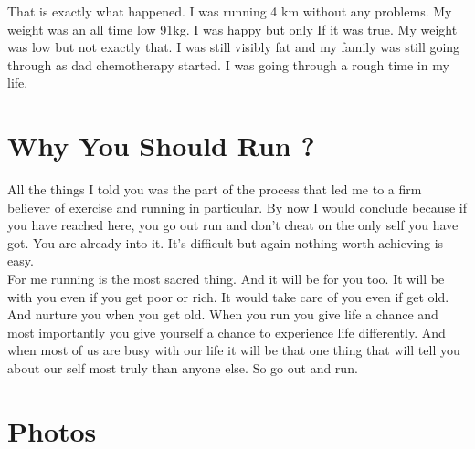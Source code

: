 \documentclass[]{article}
\begin{document}
That is exactly what happened. I was running 4 km without any problems. My weight was an all time low 91kg. I was happy but only If it was true. My weight was low but not exactly that. I was still visibly fat and my family was still going through as dad chemotherapy started. I was going through a rough time in my life.


\section*{Why You Should Run ?}
All the things I told you was the part of the process that led me to a firm believer of exercise and running in particular. 
By now I would conclude because if you have reached here, you go out run and don't cheat on the only self you have got. You are already into it. It's difficult but again nothing worth achieving is easy. \\
For me running is the most sacred thing. And it will be for you too. It will be with you even if you get poor or rich. It would take care of you even if get old. And nurture you when you get old. When you run you give life a chance and most importantly you give yourself a chance to experience life differently. And when most of us are busy with our life it will be that one thing that will tell you about our self most truly than anyone else. So go out and run. 



\newpage
\section{Photos}
\end{document}

